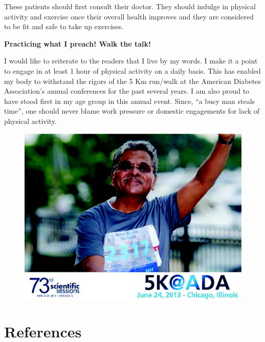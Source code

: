 These patients should first consult their doctor. They should indulge in physical activity and exercise once their overall health improves and they are considered to be fit and safe to take up exercises.

\textbf{Practicing what I preach! Walk the talk!}

I would like to reiterate to the readers that I live by my words. I make it a point to engage in at least 1 hour of physical activity on a daily basis. This has enabled my body to withstand the rigors of the 5 Km run/walk at the American Diabetes Association’s annual conferences for the past several years. I am also proud to have stood first in my age group in this annual event. Since, “a busy man steals time”, one should never blame work pressure or domestic engagements for lack of physical activity.

\begin{figure}
\includegraphics{images/087.jpg}
\end{figure}


\section*{References}

